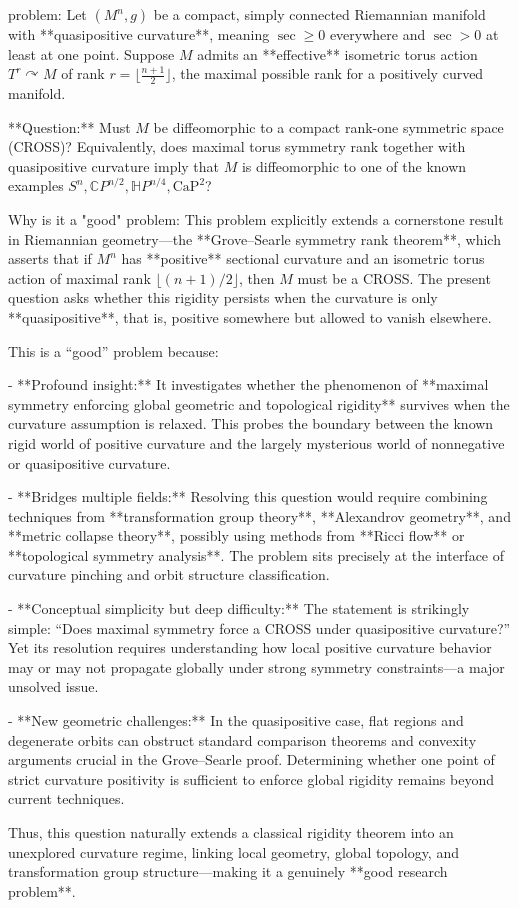 problem:  
Let \( (M^n, g) \) be a compact, simply connected Riemannian manifold with **quasipositive curvature**, meaning \( \sec \ge 0 \) everywhere and \( \sec > 0 \) at least at one point. Suppose \( M \) admits an **effective** isometric torus action \( T^r \curvearrowright M \) of rank \( r = \lfloor \tfrac{n+1}{2} \rfloor \), the maximal possible rank for a positively curved manifold.  

**Question:**  
Must \( M \) be diffeomorphic to a compact rank-one symmetric space (CROSS)?  
Equivalently, does maximal torus symmetry rank together with quasipositive curvature imply that \( M \) is diffeomorphic to one of the known examples \( S^n, \mathbb{C}P^{n/2}, \mathbb{H}P^{n/4}, \mathrm{CaP}^2 \)?  

Why is it a "good" problem:  
This problem explicitly extends a cornerstone result in Riemannian geometry—the **Grove–Searle symmetry rank theorem**, which asserts that if \( M^n \) has **positive** sectional curvature and an isometric torus action of maximal rank \( \lfloor (n+1)/2 \rfloor \), then \( M \) must be a CROSS. The present question asks whether this rigidity persists when the curvature is only **quasipositive**, that is, positive somewhere but allowed to vanish elsewhere.  

This is a “good” problem because:  

- **Profound insight:** It investigates whether the phenomenon of **maximal symmetry enforcing global geometric and topological rigidity** survives when the curvature assumption is relaxed. This probes the boundary between the known rigid world of positive curvature and the largely mysterious world of nonnegative or quasipositive curvature.  

- **Bridges multiple fields:** Resolving this question would require combining techniques from **transformation group theory**, **Alexandrov geometry**, and **metric collapse theory**, possibly using methods from **Ricci flow** or **topological symmetry analysis**. The problem sits precisely at the interface of curvature pinching and orbit structure classification.  

- **Conceptual simplicity but deep difficulty:** The statement is strikingly simple: “Does maximal symmetry force a CROSS under quasipositive curvature?” Yet its resolution requires understanding how local positive curvature behavior may or may not propagate globally under strong symmetry constraints—a major unsolved issue.  

- **New geometric challenges:** In the quasipositive case, flat regions and degenerate orbits can obstruct standard comparison theorems and convexity arguments crucial in the Grove–Searle proof. Determining whether one point of strict curvature positivity is sufficient to enforce global rigidity remains beyond current techniques.  

Thus, this question naturally extends a classical rigidity theorem into an unexplored curvature regime, linking local geometry, global topology, and transformation group structure—making it a genuinely **good research problem**.